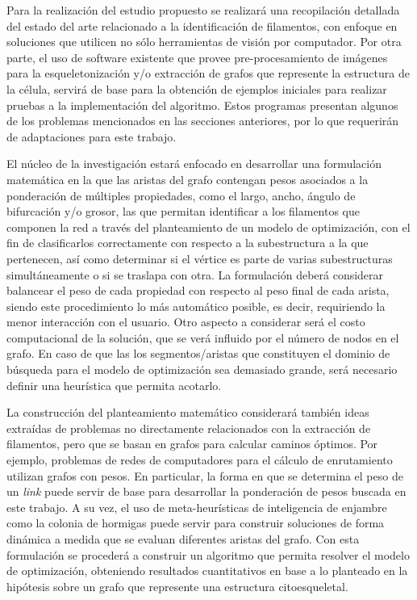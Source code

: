 \documentclass{article}
\begin{document}
Para la realizaci\'on del estudio propuesto se realizar\'a una recopilaci\'on detallada del estado del arte relacionado a la identificaci\'on de filamentos, con enfoque en soluciones que utilicen no s\'olo herramientas de visi\'on por computador.
Por otra parte, el uso de software existente que provee pre-procesamiento de im\'agenes para la esqueletonizaci\'on y/o extracción de grafos que represente la estructura de la c\'elula, servir\'a de base para la obtenci\'on de ejemplos iniciales para realizar pruebas a la implementaci\'on del algoritmo. Estos programas presentan algunos de los problemas mencionados en las secciones anteriores, por lo que requerir\'an de adaptaciones para este trabajo.  


El n\'ucleo de la investigaci\'on estar\'a enfocado en desarrollar una formulaci\'on matem\'atica en la que las aristas del grafo contengan pesos asociados a la ponderaci\'on de m\'ultiples propiedades, como el largo, ancho, \'angulo de bifurcación y/o grosor, las que permitan identificar a los filamentos que componen la red a trav\'es del planteamiento de un modelo de optimizaci\'on, con el fin de clasificarlos correctamente con respecto a la subestructura a la que pertenecen, as\'i como determinar si el v\'ertice es parte de varias subestructuras simult\'aneamente o si se traslapa con otra.
La formulaci\'on deber\'a considerar balancear el peso de cada propiedad con respecto al peso final de cada arista, siendo este procedimiento lo m\'as autom\'atico posible, es decir, requiriendo la menor interacci\'on con el usuario. Otro aspecto a considerar ser\'a el costo computacional de la soluci\'on, que se ver\'a influido por el n\'umero de nodos en el grafo. En caso de que las los segmentos/aristas que constituyen el dominio de b\'usqueda para el modelo de optimizaci\'on sea demasiado grande, ser\'a necesario definir una heur\'istica que permita acotarlo.

La construcci\'on del planteamiento matem\'atico considerar\'a tambi\'en ideas extra\'idas de problemas no directamente relacionados con la extracci\'on de filamentos, pero que se basan en grafos para calcular caminos \'optimos. Por ejemplo, problemas de redes de computadores para el c\'alculo de enrutamiento utilizan grafos con pesos. En particular, la forma en que se determina el peso de un {\it link} puede servir de base para desarrollar la ponderaci\'on de pesos buscada en este trabajo. A su vez, el uso de meta-heur\'isticas de inteligencia de enjambre como la colonia de hormigas puede servir para construir soluciones de forma din\'amica a medida que se evaluan diferentes aristas del grafo.
Con esta formulaci\'on se proceder\'a a construir un algoritmo que permita resolver el modelo de optimizaci\'on, obteniendo resultados cuantitativos en base a lo planteado en la hip\'otesis sobre un grafo que represente una estructura citoesqueletal. 
\end{document}
